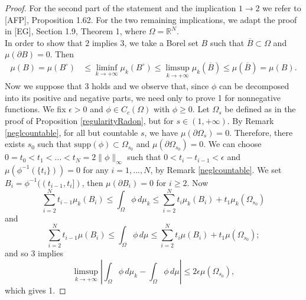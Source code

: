 \begin{proof} For the second part of the statement and the implication $1 \to 2$ we refer to [AFP], Proposition 1.62. For the two remaining implications, we adapt the proof in [EG], Section 1.9, Theorem 1, where $\Omega = \mathbb{R}^{N}$.
\\
In order to show that $2$ implies $3$, we take a Borel set $B$ such that $\overline{B} \subset \Omega$ and $\mu(\partial B) = 0$. Then
\begin{align*} \mu(B) = \mu(B^{\circ}) & \le \liminf\limits_{k \to +\infty} \mu_{k}(B^{\circ}) \le \limsup\limits_{k \to +\infty} \mu_{k}(\overline{B}) \le \mu(\overline{B}) = \mu(B). \end{align*}
Now we suppose that 3 holds and we observe that, since $\phi$ can be decomposed into its positive and negative parts, we need only to prove 1 for nonnegative functions. We fix $\epsilon > 0$ and $\phi \in C_{c}(\Omega)$ with $\phi \ge 0$. Let $\Omega_{s}$ be defined as in the proof of Proposition \ref{regularityRadon}, but for $s \in (1, + \infty)$. By Remark \ref{neglcountable}, for all but countable $s$, we have $\mu(\partial \Omega_{s}) = 0$. Therefore, there exists $s_{0}$ such that $\mathrm{supp}(\phi) \subset \Omega_{s_{0}}$ and $\mu(\partial \Omega_{s_{0}}) = 0$. We can choose $0 = t_{0} < t_{1} < ... < t_{N} = 2 \|\phi\|_{\infty}$ such that $0 < t_{i} - t_{i - 1} < \epsilon$ and $\mu(\phi^{-1}(\{t_{i}\})) = 0$ for any $i = 1, ..., N$, by Remark \ref{neglcountable}. We set $B_{i} = \phi^{-1}((t_{i - 1}, t_{i}])$, then $\mu(\partial B_{i}) = 0$ for $i \ge 2$. Now
\[ \sum_{i = 2}^{N} t_{i - 1} \mu_{k}(B_{i}) \le \int_{\Omega} \phi \, d \mu_{k} \le \sum_{i = 2}^{N} t_{i} \mu_{k}(B_{i}) + t_{1} \mu_{k}(\Omega_{s_{0}})\]
and
\[ \sum_{i = 2}^{N} t_{i - 1} \mu(B_{i}) \le \int_{\Omega} \phi \, d \mu \le \sum_{i = 2}^{N} t_{i} \mu(B_{i}) + t_{1} \mu(\Omega_{s_{0}}); \]
and so 3 implies
\[ \limsup \limits_{k \to + \infty} \left | \int_{\Omega} \phi \, d \mu_{k} - \int_{\Omega} \phi \, d \mu \right | \le 2 \epsilon \mu(\Omega_{s_{0}}), \]
which gives 1. 
\end{proof}

